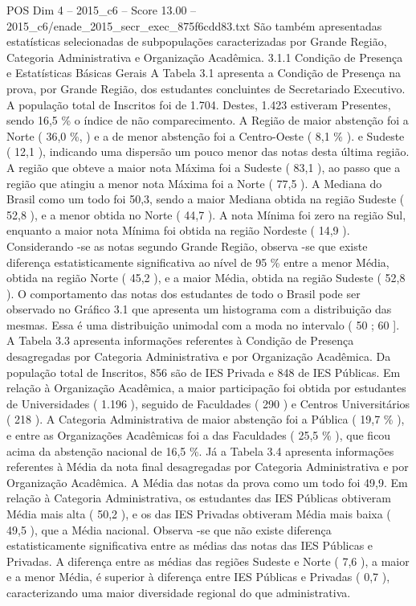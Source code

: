 \begin{textsample}{POS Dim 4 – 2015\_c6 – Score 13.00 – 2015\_c6/enade\_2015\_secr\_exec\_875f6cdd83.txt}
São também apresentadas estatísticas selecionadas de subpopulações caracterizadas por Grande Região, Categoria Administrativa e Organização Acadêmica. 3.1.1 Condição de Presença e Estatísticas Básicas Gerais A Tabela 3.1 apresenta a Condição de Presença na prova, por Grande Região, dos estudantes concluintes de Secretariado Executivo.
A população total de Inscritos foi de 1.704.
Destes, 1.423 estiveram Presentes, sendo 16,5 \% o índice de não comparecimento.
A Região de maior abstenção foi a Norte ( 36,0 \%, ) e a de menor abstenção foi a Centro-Oeste ( 8,1 \% ). e Sudeste ( 12,1 ), indicando uma dispersão um pouco menor das notas desta última região.
A região que obteve a maior nota Máxima foi a Sudeste ( 83,1 ), ao passo que a região que atingiu a menor nota Máxima foi a Norte ( 77,5 ).
A Mediana do Brasil como um todo foi 50,3, sendo a maior Mediana obtida na região Sudeste ( 52,8 ), e a menor obtida no Norte ( 44,7 ).
A nota Mínima foi zero na região Sul, enquanto a maior nota Mínima foi obtida na região Nordeste ( 14,9 ).
Considerando -se as notas segundo Grande Região, observa -se que existe diferença estatisticamente significativa ao nível de 95 \% entre a menor Média, obtida na região Norte ( 45,2 ), e a maior Média, obtida na região Sudeste ( 52,8 ).
O comportamento das notas dos estudantes de todo o Brasil pode ser observado no Gráfico 3.1 que apresenta um histograma com a distribuição das mesmas.
Essa é uma distribuição unimodal com a moda no intervalo ( 50 ; 60 ].
A Tabela 3.3 apresenta informações referentes à Condição de Presença desagregadas por Categoria Administrativa e por Organização Acadêmica.
Da população total de Inscritos, 856 são de IES Privada e 848 de IES Públicas.
Em relação à Organização Acadêmica, a maior participação foi obtida por estudantes de Universidades ( 1.196 ), seguido de Faculdades ( 290 ) e Centros Universitários ( 218 ).
A Categoria Administrativa de maior abstenção foi a Pública ( 19,7 \% ), e entre as Organizações Acadêmicas foi a das Faculdades ( 25,5 \% ), que ficou acima da abstenção nacional de 16,5 \%.
Já a Tabela 3.4 apresenta informações referentes à Média da nota final desagregadas por Categoria Administrativa e por Organização Acadêmica.
A Média das notas da prova como um todo foi 49,9.
Em relação à Categoria Administrativa, os estudantes das IES Públicas obtiveram Média mais alta ( 50,2 ), e os das IES Privadas obtiveram Média mais baixa ( 49,5 ), que a Média nacional.
Observa -se que não existe diferença estatisticamente significativa entre as médias das notas das IES Públicas e Privadas.
A diferença entre as médias das regiões Sudeste e Norte ( 7,6 ), a maior e a menor Média, é superior à diferença entre IES Públicas e Privadas ( 0,7 ), caracterizando uma maior diversidade regional do que administrativa.

\end{textsample}
